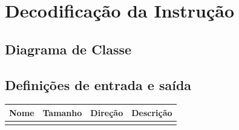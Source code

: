\section{Decodificação da Instrução}
	\subsection{Diagrama de Classe}
  \begin{figure}[htpb!]
    
  \end{figure}
		
		\subsection{Definições de entrada e saída}
		
	\begin{center}
		\begin{longtable}[pos]{| l | c | c | m{7cm} |} \hline
			\multicolumn{1}{|c|}{\cellcolor[gray]{0.9}\textbf{Nome}} & 
			\multicolumn{1}{c|}{\cellcolor[gray]{0.9}\textbf{Tamanho}} & 
			\multicolumn{1}{c|}{\cellcolor[gray]{0.9}\textbf{Direção}} &
			\multicolumn{1}{c|}{\cellcolor[gray]{0.9}\textbf{Descrição}} \\ \hline
			\endhead
			\hline
			\endlastfoot
			

\end{longtable}
\end{center}
